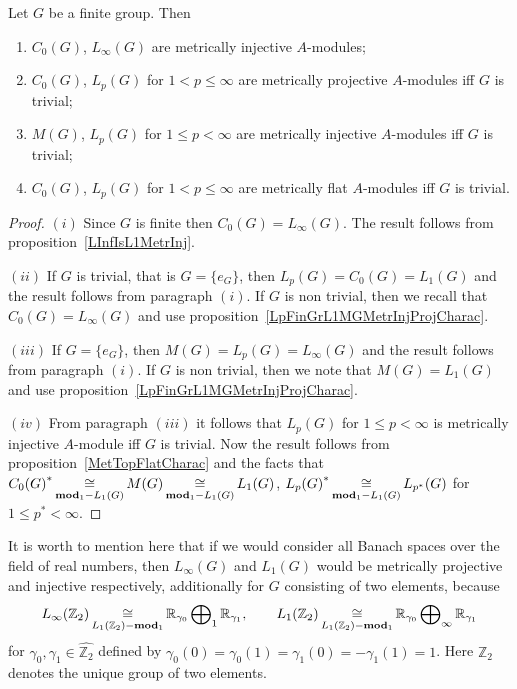\begin{proposition}\label{StdModFinGrL1MGMetrInjProjFlatCharac} Let $G$ be a
finite group. Then

\begin{enumerate}[label = (\roman*)]
    \item $C_0(G)$, $L_\infty(G)$ are metrically injective $A$-modules;

    \item $C_0(G)$, $L_p(G)$ for $1<p\leq\infty$ are metrically projective
    $A$-modules iff $G$ is trivial;

    \item $M(G)$, $L_p(G)$ for $1\leq p<\infty$ are metrically injective
    $A$-modules iff $G$ is trivial;

    \item $C_0(G)$, $L_p(G)$ for $1<p\leq\infty$ are metrically 
    flat $A$-modules iff $G$ is trivial.
\end{enumerate}
\end{proposition}
\begin{proof}
$(i)$ Since $G$ is finite then $C_0(G)=L_\infty(G)$. The result follows from
proposition~\ref{LInfIsL1MetrInj}.

$(ii)$ If $G$ is trivial, that is $G= \{e_G \}$, then $L_p(G)=C_0(G)=L_1(G)$ and
the result follows from paragraph $(i)$. If $G$ is non trivial, then we recall
that $C_0(G)=L_\infty(G)$ and use
proposition~\ref{LpFinGrL1MGMetrInjProjCharac}.

$(iii)$ If $G= \{e_G \}$, then $M(G)=L_p(G)=L_\infty(G)$ and the result follows
from paragraph $(i)$. If $G$ is non trivial, then we note that $M(G)=L_1(G)$ and
use proposition~\ref{LpFinGrL1MGMetrInjProjCharac}.

$(iv)$ From paragraph $(iii)$ it follows that $L_p(G)$ for $1\leq p<\infty$ is
metrically injective $A$-module iff $G$ is trivial. Now the result follows from
proposition~\ref{MetTopFlatCharac} and the facts that
${C_0(G)}^*\mathop{\mathbin{\cong}}\limits_{\mathbf{mod}_1-L_1(G)}M(G)\mathop{\mathbin{\cong}}\limits_{\mathbf{mod}_1-L_1(G)}L_1(G)$,
${L_p(G)}^*\mathop{\mathbin{\cong}}\limits_{\mathbf{mod}_1-L_1(G)}L_{p^*}(G)$ for $1\leq p^*<\infty$.
\end{proof}

It is worth to mention here that if we would consider all Banach spaces over the
field of real numbers, then $L_\infty(G)$ and $L_1(G)$ would be metrically
projective and injective respectively,  additionally for $G$ consisting of two
elements, because
$$
L_\infty(\mathbb{Z}_2)
\mathop{\mathbin{\cong}}\limits_{L_1(\mathbb{Z}_2)-\mathbf{mod}_1}
\mathbb{R}_{\gamma_0}\bigoplus\nolimits_1\mathbb{R}_{\gamma_1},
\qquad
L_1(\mathbb{Z}_2)
\mathop{\mathbin{\cong}}\limits_{L_1(\mathbb{Z}_2)-\mathbf{mod}_1}
\mathbb{R}_{\gamma_0}\bigoplus\nolimits_\infty\mathbb{R}_{\gamma_1}
$$
for $\gamma_0,\gamma_1\in\widehat{\mathbb{Z}_2}$ defined by
$\gamma_0(0)=\gamma_0(1)=\gamma_1(0)=-\gamma_1(1)=1$. Here $\mathbb{Z}_2$
denotes the unique group of two elements.

